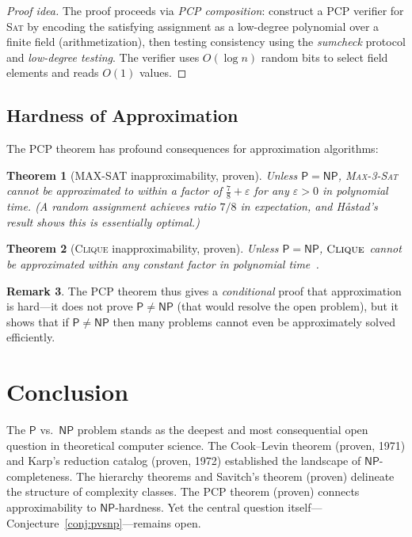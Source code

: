 \documentclass[12pt,a4paper]{amsart}
\newtheorem{theorem}{Theorem}[section]
\theoremstyle{definition}
\newtheorem{remark}[theorem]{Remark}
\newcommand{\Pclass}{\mathsf{P}}
\newcommand{\NP}{\mathsf{NP}}
\newcommand{\SAT}{\textsc{Sat}}
\newcommand{\CLIQUE}{\textsc{Clique}}
\begin{document}
\begin{proof}[Proof idea]
The proof proceeds via \emph{PCP composition}: construct a PCP verifier for
\SAT{} by encoding the satisfying assignment as a low-degree polynomial over a
finite field (arithmetization), then testing consistency using the
\emph{sumcheck} protocol and \emph{low-degree testing}.  The verifier uses
$O(\log n)$ random bits to select field elements and reads $O(1)$ values.
\end{proof}

\subsection{Hardness of Approximation}

The PCP theorem has profound consequences for approximation algorithms:

\begin{theorem}[MAX-SAT inapproximability, proven]
Unless $\Pclass=\NP$, \textsc{Max-3-Sat} cannot be approximated to within a
factor of $\frac{7}{8}+\varepsilon$ for any $\varepsilon>0$ in polynomial time.
(A random assignment achieves ratio $7/8$ in expectation, and
H{\aa}stad's result shows this is essentially optimal.)
\end{theorem}

\begin{theorem}[\CLIQUE{} inapproximability, proven]
Unless $\Pclass=\NP$, $\CLIQUE$ cannot be approximated within any constant
factor in polynomial time~\cite{hastad1999}.
\end{theorem}

\begin{remark}
The PCP theorem thus gives a \emph{conditional} proof that approximation is
hard---it does not prove $\Pclass\neq\NP$ (that would resolve the open
problem), but it shows that if $\Pclass\neq\NP$ then many problems cannot even
be approximately solved efficiently.
\end{remark}

\section*{Conclusion}

The $\Pclass$ vs.\ $\NP$ problem stands as the deepest and most consequential
open question in theoretical computer science.  The Cook--Levin theorem
(proven, 1971) and Karp's reduction catalog (proven, 1972) established the
landscape of $\NP$-completeness.  The hierarchy theorems and Savitch's theorem
(proven) delineate the structure of complexity classes.  The PCP theorem
(proven) connects approximability to $\NP$-hardness.  Yet the central question
itself---Conjecture~\ref{conj:pvsnp}---remains open.
\end{document}
